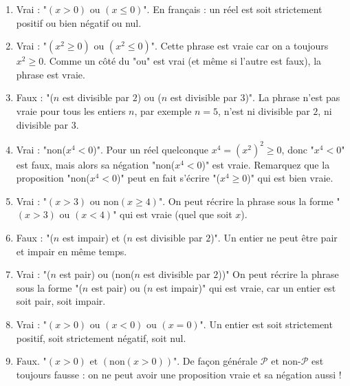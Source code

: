 \documentclass[11pt,class=report,crop=false]{standalone}
\begin{document}
\correction
\sauteligne
\begin{enumerate}
    
    \item Vrai : "$(x > 0) \text{ ou } (x \le 0)$". En français : un réel est soit strictement positif ou bien négatif ou nul.
    
    \item  Vrai : "$(x^2 \ge 0) \text{ ou } (x^2 \le 0)$". Cette phrase est vraie car on a toujours $x^2 \ge 0$. Comme un côté du "ou" est vrai (et même si l'autre est faux), la phrase est vraie.
    
    \item Faux : "($n$ est divisible par $2$) ou ($n$ est divisible par $3$)". 
    La phrase n'est pas vraie pour tous les entiers $n$, par exemple $n=5$, n'est ni divisible par $2$, ni divisible par $3$.
        
    \item Vrai : "non($x^4 < 0$)". Pour un réel quelconque $x^4 = (x^2)^2 \ge 0$, donc "$x^4 < 0$" est faux, mais alors sa négation "non($x^4 < 0$)" est vraie. Remarquez que la proposition "non($x^4 < 0$)" peut en fait s'écrire "($x^4 \geq 0$)" qui est bien vraie.
    
    \item Vrai : "$(x > 3) \text{ ou } \text{non}(x \ge 4)$". On peut récrire la phrase sous la forme "$(x > 3) \text{ ou } (x < 4)$" qui est vraie (quel que soit $x$).
      
    \item Faux : "($n$ est impair) et ($n$ est divisible par $2$)". Un entier ne peut être pair et impair en même temps.   
    
    \item Vrai : "($n$ est pair) ou (non($n$ est divisible par $2$))"
    On peut récrire la phrase sous la forme "($n$ est pair) ou ($n$ est impair)" qui est vraie, car un entier est soit pair, soit impair.
    
    \item Vrai : "$(x>0)  \text{ ou } (x<0)  \text{ ou } (x=0)$". Un entier est soit strictement positif, soit strictement négatif, soit nul.
    
    \item Faux. "$(x>0)  \text{ et } (\text{non}(x>0))$". De façon générale $\mathcal{P} \text{ et } \text{non-}\mathcal{P}$ est toujours fausse : on ne peut avoir une proposition vraie et sa négation aussi !
    
\end{enumerate}
\fincorrection
\finexercice
\end{document}
